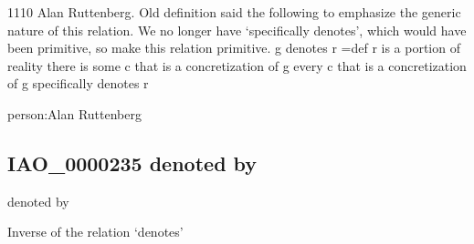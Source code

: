 \documentclass[letterpaper,10pt,english]{sphinxmanual}
\begin{document}
\begin{sphinxShadowBox}

\sphinxhyphen{}11\sphinxhyphen{}10 Alan Ruttenberg. Old definition said the following to emphasize the generic nature of this relation. We no longer have ‘specifically denotes’, which would have been primitive, so make this relation primitive.
g denotes r =def
r is a portion of reality
there is some c that is a concretization of g
every c that is a concretization of g specifically denotes r
\end{sphinxShadowBox}

\begin{sphinxShadowBox}

\sphinxAtStartPar
{}
\end{sphinxShadowBox}

\begin{sphinxShadowBox}

\sphinxAtStartPar
person:Alan Ruttenberg
\end{sphinxShadowBox}
\begin{quote}

\ignorespaces \end{quote}


\subsection{IAO\_0000235 \sphinxhyphen{} denoted by}
\label{\detokenize{doc-IAO_0000235:iao-0000235-denoted-by}}\label{\detokenize{doc-IAO_0000235:index-0}}\label{\detokenize{doc-IAO_0000235::doc}}
\begin{sphinxShadowBox}

\sphinxAtStartPar
denoted by
\end{sphinxShadowBox}

\begin{sphinxShadowBox}

\sphinxAtStartPar
Inverse of the relation ‘denotes’
\end{sphinxShadowBox}

\begin{sphinxShadowBox}

\sphinxAtStartPar
{}
\end{sphinxShadowBox}
\end{document}

